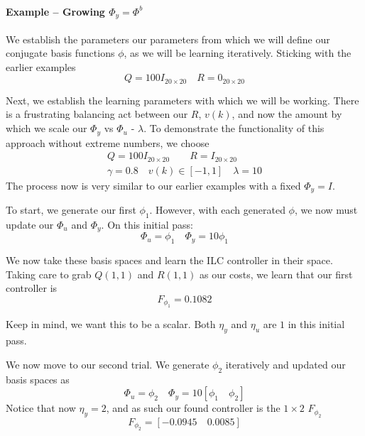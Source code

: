 \FloatBarrier\paragraph{Example -- Growing $\Phi_y = \Phi^b$}
We establish the parameters our parameters from which we will define our conjugate basis functions $\phi$, as we will be learning iteratively. Sticking with the earlier examples
\begin{equation}
    Q = 100I_{20 \times 20}
    \quad
    R = 0_{20 \times 20}
\end{equation}

Next, we establish the learning parameters with which we will be working. There is a frustrating balancing act between our $R$, $v(k)$, and now the amount by which we scale our $\Phi_y$ vs $\Phi_u$ - $\lambda$. To demonstrate the functionality of this approach without extreme numbers, we choose
\begin{equation}
    \begin{split}
        Q = 100I_{20 \times 20}
        \qquad
        R = I_{20 \times 20}
        \\
        \gamma = 0.8
        \quad
        v(k) \in [-1, 1] \quad
        \lambda = 10
    \end{split}
\end{equation}
The process now is very similar to our earlier examples with a fixed $\Phi_y = I$.

To start, we generate our first $\phi_1$. However, with each generated $\phi$, we now must update our $\Phi_u$ and $\Phi_y$. On this initial pass:
\begin{equation}
    \Phi_u = \phi_1 \quad \Phi_y = 10\phi_1
\end{equation}

We now take these basis spaces and learn the ILC controller in their space. Taking care to grab $Q(1, 1)$ and $R(1, 1)$ as our costs, we learn that our first controller is
\begin{equation}
    F_{\phi_1} = 0.1082
\end{equation}

Keep in mind, we want this to be a scalar. Both $\eta_y$ and $\eta_u$ are $1$ in this initial pass. 

We now move to our second trial. We generate $\phi_2$ iteratively and updated our basis spaces as
\begin{equation}
    \Phi_u = \phi_2 \quad \Phi_y = 10\left[\phi_1\quad \phi_2\right]
\end{equation}
Notice that now $\eta_y =2$, and as such our found controller is the $1 \times 2$ $F_{\phi_2}$
\begin{equation}
    F_{\phi_2} = \left[-0.0945  \quad   0.0085\right]
\end{equation}

